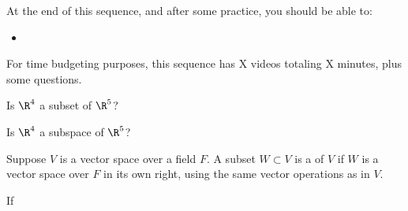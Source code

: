 







At the end of this sequence, and after some practice, you should be able to:

\begin{itemize}
\item 


\end{itemize}


For time budgeting purposes, this sequence has X videos totaling X minutes, 
plus some questions.  




\endedxtext

\endedxvertical








Is $\R^4$ a subset of $\R^5$?  



Is $\R^4$ a subspace of $\R^5$?  



\edXsolution{
}

\endedxproblem

\endedxvertical






{}  
Suppose $V$ is a vector space over a field $F$.  A subset $W \subset V$ is a {}  
of $V$ if $W$ is a vector space over $F$ in its own right, using the same vector operations as in $V$.  

If 


\endedxtext




\endedxvertical










